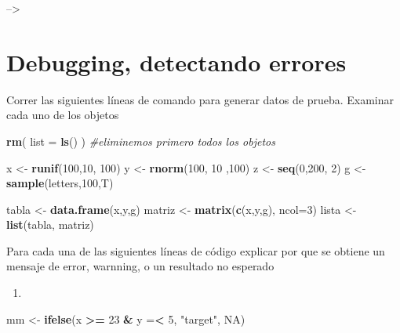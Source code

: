 \documentclass[]{book}
\newenvironment{Shaded}{\begin{snugshade}}{\end{snugshade}}
\newcommand{\CommentTok}[1]{\textcolor[rgb]{0.56,0.35,0.01}{\textit{#1}}}
\newcommand{\DataTypeTok}[1]{\textcolor[rgb]{0.13,0.29,0.53}{#1}}
\newcommand{\DecValTok}[1]{\textcolor[rgb]{0.00,0.00,0.81}{#1}}
\newcommand{\KeywordTok}[1]{\textcolor[rgb]{0.13,0.29,0.53}{\textbf{#1}}}
\newcommand{\NormalTok}[1]{#1}
\newcommand{\OperatorTok}[1]{\textcolor[rgb]{0.81,0.36,0.00}{\textbf{#1}}}
\newcommand{\OtherTok}[1]{\textcolor[rgb]{0.56,0.35,0.01}{#1}}
\newcommand{\StringTok}[1]{\textcolor[rgb]{0.31,0.60,0.02}{#1}}
\begin{document}
--\textgreater{}

\hypertarget{debugging-detectando-errores-7}{%
\section{Debugging, detectando errores}\label{debugging-detectando-errores-7}}

Correr las siguientes líneas de comando para generar datos de prueba. Examinar cada uno de los objetos

\begin{Shaded}
\begin{Highlighting}[]
\KeywordTok{rm}\NormalTok{( }\DataTypeTok{list =} \KeywordTok{ls}\NormalTok{() ) }\CommentTok{#eliminemos primero todos los objetos}
\end{Highlighting}
\end{Shaded}

\begin{Shaded}
\begin{Highlighting}[]
\NormalTok{  x <-}\StringTok{ }\KeywordTok{runif}\NormalTok{(}\DecValTok{100}\NormalTok{,}\DecValTok{10}\NormalTok{, }\DecValTok{100}\NormalTok{)}
\NormalTok{    y <-}\StringTok{ }\KeywordTok{rnorm}\NormalTok{(}\DecValTok{100}\NormalTok{, }\DecValTok{10}\NormalTok{ ,}\DecValTok{100}\NormalTok{)}
\NormalTok{        z <-}\StringTok{ }\KeywordTok{seq}\NormalTok{(}\DecValTok{0}\NormalTok{,}\DecValTok{200}\NormalTok{, }\DecValTok{2}\NormalTok{)}
\NormalTok{        g  <-}\StringTok{ }\KeywordTok{sample}\NormalTok{(letters,}\DecValTok{100}\NormalTok{,T)}

\NormalTok{        tabla <-}\StringTok{ }\KeywordTok{data.frame}\NormalTok{(x,y,g)}
\NormalTok{        matriz <-}\StringTok{ }\KeywordTok{matrix}\NormalTok{(}\KeywordTok{c}\NormalTok{(x,y,g), }\DataTypeTok{ncol=}\DecValTok{3}\NormalTok{)}
\NormalTok{        lista <-}\StringTok{ }\KeywordTok{list}\NormalTok{(tabla, matriz)}
\end{Highlighting}
\end{Shaded}

Para cada una de las siguientes líneas de código explicar por que se obtiene un mensaje de error, warnning, o un resultado no esperado

\begin{enumerate}
\def\labelenumi{\arabic{enumi}.}
\item
\end{enumerate}

\begin{Shaded}
\begin{Highlighting}[]
\NormalTok{mm <-}\StringTok{ }\KeywordTok{ifelse}\NormalTok{(x }\OperatorTok{>=}\StringTok{ }\DecValTok{23} \OperatorTok{&}\StringTok{ }\DataTypeTok{y =}\OperatorTok{<}\StringTok{ }\DecValTok{5}\NormalTok{, }\StringTok{"target"}\NormalTok{, }\OtherTok{NA}\NormalTok{)}
\end{Highlighting}
\end{Shaded}
\end{document}
